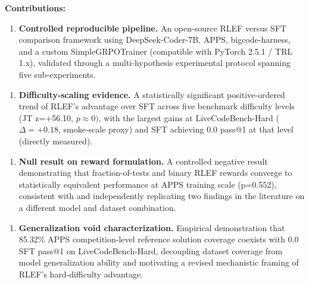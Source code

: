 \textbf{Contributions:}

\begin{enumerate}
\item \textbf{Controlled reproducible pipeline.} An open-source RLEF versus SFT comparison framework using DeepSeek-Coder-7B, APPS, bigcode-harness, and a custom SimpleGRPOTrainer (compatible with PyTorch 2.5.1 / TRL 1.x), validated through a multi-hypothesis experimental protocol spanning five sub-experiments.
\end{enumerate}

\begin{enumerate}
\item \textbf{Difficulty-scaling evidence.} A statistically significant positive-ordered trend of RLEF's advantage over SFT across five benchmark difficulty levels (JT z=+56.10, $p\approx 0)$, with the largest gains at LiveCodeBench-Hard ($\Delta =+0.18$, smoke-scale proxy) and SFT achieving 0.0 pass@1 at that level (directly measured).
\end{enumerate}

\begin{enumerate}
\item \textbf{Null result on reward formulation.} A controlled negative result demonstrating that fraction-of-tests and binary RLEF rewards converge to statistically equivalent performance at APPS training scale (p=0.552), consistent with and independently replicating two findings in the literature on a different model and dataset combination.
\end{enumerate}

\begin{enumerate}
\item \textbf{Generalization void characterization.} Empirical demonstration that 85.32\% APPS competition-level reference solution coverage coexists with 0.0 SFT pass@1 on LiveCodeBench-Hard, decoupling dataset coverage from model generalization ability and motivating a revised mechanistic framing of RLEF's hard-difficulty advantage.
\end{enumerate}

